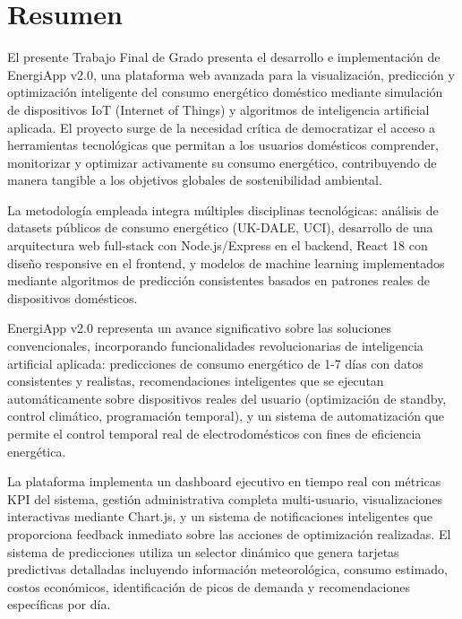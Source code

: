 \documentclass[12pt,a4paper,spanish]{book}
\begin{document}
\frontmatter

\chapter*{Resumen}

El presente Trabajo Final de Grado presenta el desarrollo e implementación de EnergiApp v2.0, una plataforma web avanzada para la visualización, predicción y optimización inteligente del consumo energético doméstico mediante simulación de dispositivos IoT (Internet of Things) y algoritmos de inteligencia artificial aplicada. El proyecto surge de la necesidad crítica de democratizar el acceso a herramientas tecnológicas que permitan a los usuarios domésticos comprender, monitorizar y optimizar activamente su consumo energético, contribuyendo de manera tangible a los objetivos globales de sostenibilidad ambiental.

La metodología empleada integra múltiples disciplinas tecnológicas: análisis de datasets públicos de consumo energético (UK-DALE, UCI), desarrollo de una arquitectura web full-stack con Node.js/Express en el backend, React 18 con diseño responsive en el frontend, y modelos de machine learning implementados mediante algoritmos de predicción consistentes basados en patrones reales de dispositivos domésticos.

EnergiApp v2.0 representa un avance significativo sobre las soluciones convencionales, incorporando funcionalidades revolucionarias de inteligencia artificial aplicada: predicciones de consumo energético de 1-7 días con datos consistentes y realistas, recomendaciones inteligentes que se ejecutan automáticamente sobre dispositivos reales del usuario (optimización de standby, control climático, programación temporal), y un sistema de automatización que permite el control temporal real de electrodomésticos con fines de eficiencia energética.

La plataforma implementa un dashboard ejecutivo en tiempo real con métricas KPI del sistema, gestión administrativa completa multi-usuario, visualizaciones interactivas mediante Chart.js, y un sistema de notificaciones inteligentes que proporciona feedback inmediato sobre las acciones de optimización realizadas. El sistema de predicciones utiliza un selector dinámico que genera tarjetas predictivas detalladas incluyendo información meteorológica, consumo estimado, costos económicos, identificación de picos de demanda y recomendaciones específicas por día.
\end{document}

